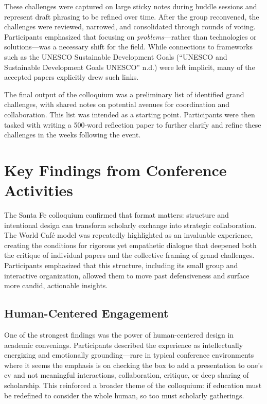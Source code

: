 \documentclass[
  letterpaper,
  DIV=11,
  numbers=noendperiod]{scrartcl}
\begin{document}
These challenges were captured on large sticky notes during huddle
sessions and represent draft phrasing to be refined over time. After the
group reconvened, the challenges were reviewed, narrowed, and
consolidated through rounds of voting. Participants emphasized that
focusing on \emph{problems}---rather than technologies or
solutions---was a necessary shift for the field. While connections to
frameworks such as the UNESCO Sustainable Development Goals ({``{UNESCO}
and {Sustainable Development Goals} \textbar{} {UNESCO}''} n.d.) were
left implicit, many of the accepted papers explicitly drew such links.

The final output of the colloquium was a preliminary list of identified
grand challenges, with shared notes on potential avenues for
coordination and collaboration. This list was intended as a starting
point. Participants were then tasked with writing a 500-word reflection
paper to further clarify and refine these challenges in the weeks
following the event.

\section{Key Findings from Conference
Activities}\label{key-findings-from-conference-activities}

The Santa Fe colloquium confirmed that format matters: structure and
intentional design can transform scholarly exchange into strategic
collaboration. The World Café model was repeatedly highlighted as an
invaluable experience, creating the conditions for rigorous yet
empathetic dialogue that deepened both the critique of individual papers
and the collective framing of grand challenges. Participants emphasized
that this structure, including its small group and interactive
organization, allowed them to move past defensiveness and surface more
candid, actionable insights.

\subsection{Human-Centered Engagement}\label{human-centered-engagement}

One of the strongest findings was the power of human-centered design in
academic convenings. Participants described the experience as
intellectually energizing and emotionally grounding---rare in typical
conference environments where it seems the emphasis is on checking the
box to add a presentation to one's cv and not meaningful interactions,
collaboration, critique, or deep sharing of scholarship. This reinforced
a broader theme of the colloquium: if education must be redefined to
consider the whole human, so too must scholarly gatherings.
\end{document}
